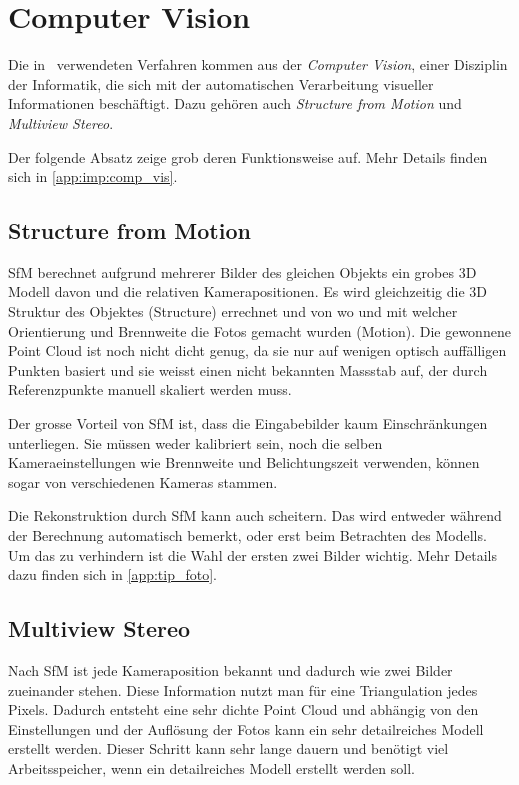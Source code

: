	\section{Computer Vision}
		Die in \dronarch\ verwendeten Verfahren kommen aus der \emph{Computer Vision}, einer Disziplin der Informatik, die sich mit der automatischen Verarbeitung visueller Informationen beschäftigt. Dazu gehören auch \emph{Structure from Motion} und \emph{Multiview Stereo}.

		Der folgende Absatz zeige grob deren Funktionsweise auf. Mehr Details finden sich in \autoref{app:imp:comp_vis}.
		
		\subsection{Structure from Motion} \label{sfm}
			SfM berechnet aufgrund mehrerer Bilder des gleichen Objekts ein grobes 3D Modell davon und die relativen Kamerapositionen. Es wird gleichzeitig die 3D Struktur des Objektes (Structure) errechnet und von wo und mit welcher Orientierung und Brennweite die Fotos gemacht wurden (Motion).
			Die gewonnene Point Cloud ist noch nicht dicht genug, da sie nur auf wenigen optisch auffälligen Punkten basiert und sie weisst einen nicht bekannten Massstab auf, der durch Referenzpunkte manuell skaliert werden muss.
			
			Der grosse Vorteil von SfM ist, dass die Eingabebilder kaum Einschränkungen unterliegen. Sie müssen weder kalibriert sein, noch die selben Kameraeinstellungen wie Brennweite und Belichtungszeit verwenden, können sogar von verschiedenen Kameras stammen.
			
			Die Rekonstruktion durch SfM kann auch scheitern. Das wird entweder während der Berechnung automatisch bemerkt, oder erst beim Betrachten des Modells. Um das zu verhindern ist die Wahl der ersten zwei Bilder wichtig. Mehr Details dazu finden sich in \autoref{app:tip_foto}.
								
		\subsection{Multiview Stereo} \label{mvs}
			Nach SfM ist jede Kameraposition bekannt und dadurch wie zwei Bilder zueinander stehen. Diese Information nutzt man für eine Triangulation jedes Pixels. Dadurch entsteht eine sehr dichte Point Cloud und abhängig von den Einstellungen und der Auflösung der Fotos kann ein sehr detailreiches Modell erstellt werden.
			Dieser Schritt kann sehr lange dauern und benötigt viel Arbeitsspeicher, wenn ein detailreiches Modell erstellt werden soll.
			
